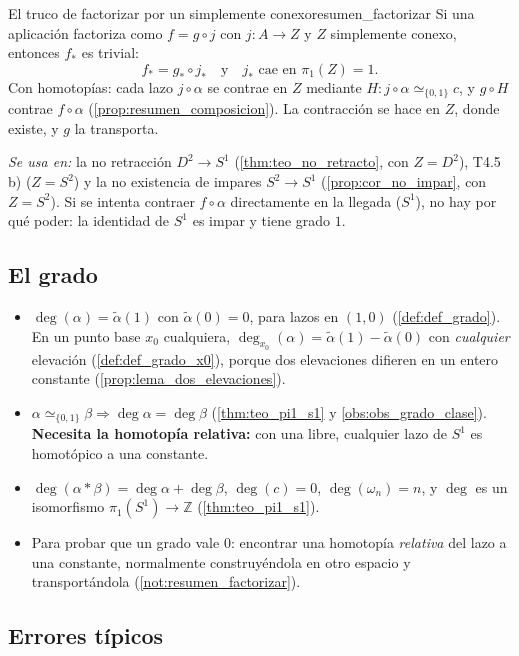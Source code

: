\begin{nota}{El truco de factorizar por un simplemente conexo}{resumen_factorizar}
Si una aplicación factoriza como $f = g \circ j$ con $j \colon A \to Z$ y $Z$ simplemente conexo, entonces $f_*$ es trivial:
\[ f_* = g_* \circ j_* \quad\text{y}\quad j_* \text{ cae en } \pi_1(Z) = 1. \]
Con homotopías: cada lazo $j \circ \alpha$ se contrae en $Z$ mediante $H \colon j \circ \alpha \simeq_{\{0,1\}} c$, y $g \circ H$ contrae $f \circ \alpha$ (\cref{prop:resumen_composicion}). La contracción se hace en $Z$, donde existe, y $g$ la transporta.

\emph{Se usa en:} la no retracción $D^2 \to S^1$ (\cref{thm:teo_no_retracto}, con $Z = D^2$), T4.5 b) ($Z = S^2$) y la no existencia de impares $S^2 \to S^1$ (\cref{prop:cor_no_impar}, con $Z = S^2$). Si se intenta contraer $f \circ \alpha$ directamente en la llegada ($S^1$), no hay por qué poder: la identidad de $S^1$ es impar y tiene grado $1$.
\end{nota}

\subsection{El grado}

\begin{itemize}
    \item $\deg(\alpha) = \tilde\alpha(1)$ con $\tilde\alpha(0) = 0$, para lazos en $(1,0)$ (\cref{def:def_grado}). En un punto base $x_0$ cualquiera, $\deg_{x_0}(\alpha) = \tilde\alpha(1) - \tilde\alpha(0)$ con \emph{cualquier} elevación (\cref{def:def_grado_x0}), porque dos elevaciones difieren en un entero constante (\cref{prop:lema_dos_elevaciones}).
    \item $\alpha \simeq_{\{0,1\}} \beta \Rightarrow \deg \alpha = \deg \beta$ (\cref{thm:teo_pi1_s1} y \cref{obs:obs_grado_clase}). \textbf{Necesita la homotopía relativa:} con una libre, cualquier lazo de $S^1$ es homotópico a una constante.
    \item $\deg(\alpha * \beta) = \deg \alpha + \deg \beta$, $\deg(c) = 0$, $\deg(\omega_n) = n$, y $\deg$ es un isomorfismo $\pi_1(S^1) \to \mathbb{Z}$ (\cref{thm:teo_pi1_s1}).
    \item Para probar que un grado vale $0$: encontrar una homotopía \emph{relativa} del lazo a una constante, normalmente construyéndola en otro espacio y transportándola (\cref{not:resumen_factorizar}).
\end{itemize}

\subsection{Errores típicos}

